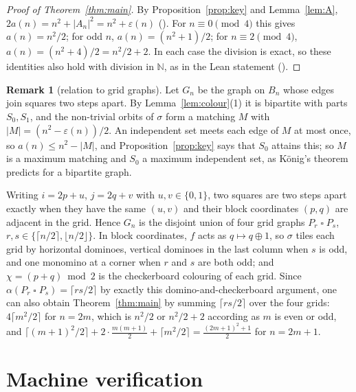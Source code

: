\documentclass[11pt]{amsart}
\theoremstyle{plain}
\theoremstyle{definition}
\newtheorem{remark}[theorem]{Remark}
\newcommand{\N}{\mathbb{N}}
\newcommand{\B}{B_n}
\begin{document}
\begin{proof}[Proof of Theorem~\ref{thm:main}]
By Proposition~\ref{prop:key} and Lemma~\ref{lem:A}, $2a(n)=n^2+|A_n|^2=n^2+\varepsilon(n)$ (). For $n\equiv0\pmod4$ this gives $a(n)=n^2/2$; for odd $n$, $a(n)=(n^2+1)/2$; for $n\equiv2\pmod4$, $a(n)=(n^2+4)/2=n^2/2+2$. In each case the division is exact, so these identities also hold with division in $\N$, as in the Lean statement ().
\end{proof}

\begin{remark}[relation to grid graphs]\label{rem:grid}
Let $G_n$ be the graph on $\B$ whose edges join squares two steps apart. By Lemma~\ref{lem:colour}(1) it is bipartite with parts $S_0,S_1$, and the non-trivial orbits of $\sigma$ form a matching $M$ with $|M|=(n^2-\varepsilon(n))/2$. An independent set meets each edge of $M$ at most once, so $a(n)\le n^2-|M|$, and Proposition~\ref{prop:key} says that $S_0$ attains this; so $M$ is a maximum matching and $S_0$ a maximum independent set, as König's theorem predicts for a bipartite graph.

Writing $i=2p+u$, $j=2q+v$ with $u,v\in\{0,1\}$, two squares are two steps apart exactly when they have the same $(u,v)$ and their block coordinates $(p,q)$ are adjacent in the grid. Hence $G_n$ is the disjoint union of four grid graphs $P_r\mathbin{\square}P_s$, $r,s\in\{\lceil n/2\rceil,\lfloor n/2\rfloor\}$. In block coordinates, $f$ acts as $q\mapsto q\oplus1$, so $\sigma$ tiles each grid by horizontal dominoes, vertical dominoes in the last column when $s$ is odd, and one monomino at a corner when $r$ and $s$ are both odd; and $\chi=(p+q)\bmod 2$ is the checkerboard colouring of each grid. Since $\alpha(P_r\mathbin{\square}P_s)=\lceil rs/2\rceil$ by exactly this domino-and-checkerboard argument, one can also obtain Theorem~\ref{thm:main} by summing $\lceil rs/2\rceil$ over the four grids: $4\lceil m^2/2\rceil$ for $n=2m$, which is $n^2/2$ or $n^2/2+2$ according as $m$ is even or odd, and $\lceil (m+1)^2/2\rceil+2\cdot\frac{m(m+1)}{2}+\lceil m^2/2\rceil=\frac{(2m+1)^2+1}{2}$ for $n=2m+1$.
\end{remark}

\section{Machine verification}\label{sec:lean}
\end{document}

